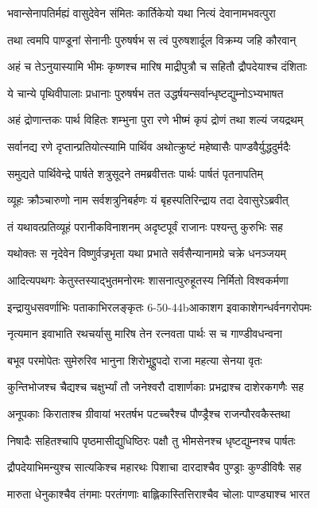 \twolineshloka
{भवान्सेनापतिर्मह्यं वासुदेवेन संमितः}
{कार्तिकेयो यथा नित्यं देवानामभवत्पुरा}


\twolineshloka
{तथा त्वमपि पाण्डूनां सेनानीः पुरुषर्षभ}
{स त्वं पुरुषशार्दूल विक्रम्य जहि कौरवान्}


\twolineshloka
{अहं च तेऽनुयास्यामि भीमः कृष्णश्च मारिष}
{माद्रीपुत्रौ च सहितौ द्रौपदेयाश्च दंशिताः}


\twolineshloka
{ये चान्ये पृथिवीपालाः प्रधानाः पुरुषर्षभ}
{तत उद्धर्षयन्सर्वान्धृष्टद्युम्नोऽभ्यभाषत}


\twolineshloka
{अहं द्रोणान्तकः पार्थ विहितः शम्भुना पुरा}
{रणे भीष्मं कृपं द्रोणं तथा शल्यं जयद्रथम्}


\twolineshloka
{सर्वानद्य रणे दृप्तान्प्रतियोत्स्यामि पार्थिव}
{अथोत्क्रुष्टं महेष्वासैः पाण्डवैर्युद्धदुर्मदैः}


\twolineshloka
{समुद्यते पार्थिवेन्द्रे पार्षते शत्रुसूदने}
{तमब्रवीत्ततः पार्थः पार्षतं पृतनापतिम्}


\twolineshloka
{व्यूहः क्रौञ्चारुणो नाम सर्वशत्रुनिबर्हणः}
{यं बृहस्पतिरिन्द्राय तदा देवासुरेऽब्रवीत्}


\twolineshloka
{तं यथावत्प्रतिव्यूहं परानीकविनाशनम्}
{अदृष्टपूर्वं राजानः पश्यन्तु कुरुभिः सह}


\twolineshloka
{यथोक्तः स नृदेवेन विष्णुर्वज्रभृता यथा}
{प्रभाते सर्वसैन्यानामग्रे चक्रे धनञ्जयम्}


\twolineshloka
{आदित्यपथगः केतुस्तस्याद्भुतमनोरमः}
{शासनात्पुरुहूतस्य निर्मितो विश्वकर्मणा}


\twolineshloka
{इन्द्रायुधसवर्णाभिः पताकाभिरलङ्कृतः}
{6-50-44bआकाशग इवाकाशेगन्धर्वनगरोपमः}


\twolineshloka
{नृत्यमान इवाभाति रथचर्यासु मारिष}
{तेन रत्नवता पार्थः स च गाण्डीवधन्वना}


\twolineshloka
{बभूव परमोपेतः सुमेरुरिव भानुना}
{शिरोभूद्द्रुपदो राजा महत्या सेनया वृतः}


\twolineshloka
{कुन्तिभोजश्च चैद्यश्च चक्षुर्भ्यां तौ जनेश्वरौ}
{दाशार्णकाः प्रभद्राश्च दाशेरकगणैः सह}


\twolineshloka
{अनूपकाः किराताश्च ग्रीवायां भरतर्षभ}
{पटच्चरैश्च पौण्ड्रैश्च राजन्पौरवकैस्तथा}


\twolineshloka
{निषादैः सहितश्चापि पृष्ठमासीद्युधिष्ठिरः}
{पक्षौ तु भीमसेनश्च धृष्टद्युम्नश्च पार्षतः}


\twolineshloka
{द्रौपदेयाभिमन्युश्च सात्यकिश्च महारथः}
{पिशाचा दारदाश्चैव पुण्ड्राः कुण्डीविषैः सह}


\twolineshloka
{मारुता धेनुकाश्चैव तंगमाः परतंगणाः}
{बाह्लिकास्तित्तिराश्चैव चोलाः पाण्ड्याश्च भारत}


